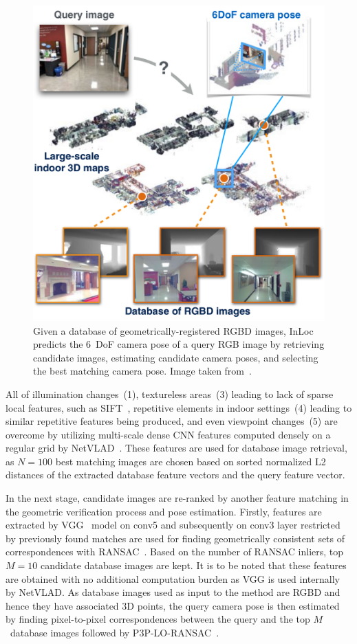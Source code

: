 \begin{figure}
    \centering
    \includegraphics[width=.5\textwidth]{../graphics/inloc.png}
    \caption{Given a database of geometrically-registered RGBD images, InLoc predicts
    the 6~DoF camera pose of a query RGB image by retrieving candidate images, estimating candidate camera poses, and selecting
    the best matching camera pose. Image taken from~\citet{InLoc}.}\label{fig:inloc_intro}
\end{figure}

All of illumination changes~(1), textureless areas~(3) leading to lack of sparse local features, such as SIFT~\citep{SIFT},
repetitive elements in indoor settings~(4) leading to similar repetitive features being produced, and even viewpoint changes~(5)
are overcome by utilizing multi-scale dense CNN features computed densely on a regular grid by NetVLAD~\citep{NetVLAD}.
These features are used for database image retrieval, as $N=100$ best matching images are chosen based on sorted
normalized L2 distances of the extracted database feature vectors and the query feature vector.

In the next stage, candidate images are re-ranked by another feature matching in the geometric verification process and
pose estimation. Firstly, features are extracted by VGG~\citep{VGG16} model on conv5 and subsequently on conv3 layer
restricted by previously found matches are used for finding geometrically consistent sets of correspondences with
RANSAC~\citep{RANSAC}. Based on the number of RANSAC inliers, top $M = 10$ candidate database images are kept.
It is to be noted that these features are obtained with no additional computation burden as VGG is used internally
by NetVLAD. As database images used as input to the method are RGBD and hence they have associated 3D points, the
query camera pose is then estimated by finding pixel-to-pixel correspondences between the query and the top
$M$~database images followed by P3P-LO-RANSAC~\citep{P3PLORANSAC}.

